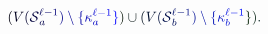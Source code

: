 \documentclass[12pt]{article}
\begin{document}
\makeatletter
\renewcommand*{\@textcolor}[3]{%
  \protect\leavevmode
  \begingroup
    \color#1{#2}#3%
  \endgroup
}
\makeatother
\begin{displaymath}
\mathcolor[RGB]{0,0,15}{(} \mathcolor[RGB]{0,0,30}{V} \mathcolor[RGB]{0,0,45}{(} \mathcal { \mathcolor[RGB]{0,0,60}{S} } _ { \mathcolor[RGB]{0,0,75}{a} } ^ { \mathcolor[RGB]{0,0,90}{\ell} \mathcolor[RGB]{0,0,105}{-} \mathcolor[RGB]{0,0,120}{1} } \mathcolor[RGB]{0,0,135}{)} \mathcolor[RGB]{0,0,150}{\setminus} \mathcolor[RGB]{0,0,165}{\{} \mathcolor[RGB]{0,0,180}{\kappa} _ { \mathcolor[RGB]{0,0,195}{a} } ^ { \mathcolor[RGB]{0,0,210}{\ell} \mathcolor[RGB]{0,0,225}{-} \mathcolor[RGB]{0,0,240}{1} } \mathcolor[RGB]{0,0,255}{\}} \mathcolor[RGB]{0,15,0}{)} \mathcolor[RGB]{0,15,15}{\cup} \mathcolor[RGB]{0,15,30}{(} \mathcolor[RGB]{0,15,45}{V} \mathcolor[RGB]{0,15,60}{(} \mathcal { \mathcolor[RGB]{0,15,75}{S} } _ { \mathcolor[RGB]{0,15,90}{b} } ^ { \mathcolor[RGB]{0,15,105}{\ell} \mathcolor[RGB]{0,15,120}{-} \mathcolor[RGB]{0,15,135}{1} } \mathcolor[RGB]{0,15,150}{)} \mathcolor[RGB]{0,15,165}{\setminus} \mathcolor[RGB]{0,15,180}{\{} \mathcolor[RGB]{0,15,195}{\kappa} _ { \mathcolor[RGB]{0,15,210}{b} } ^ { \mathcolor[RGB]{0,15,225}{\ell} \mathcolor[RGB]{0,15,240}{-} \mathcolor[RGB]{0,15,255}{1} } \mathcolor[RGB]{0,30,0}{\}} \mathcolor[RGB]{0,30,15}{)} \mathcolor[RGB]{0,30,30}{.}
\end{displaymath}
\end{document}
